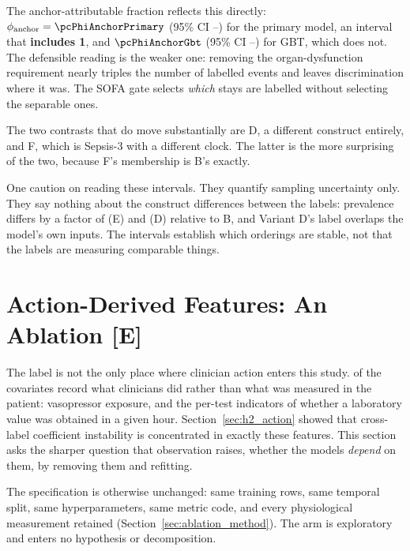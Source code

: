 The anchor-attributable fraction reflects this directly:
$\phi_{\text{anchor}} = \pcPhiAnchorPrimary$ (95\% CI
\pcPhiAnchorCiLoPrimary--\pcPhiAnchorCiHiPrimary) for the primary model, an
interval that \textbf{includes 1}, and $\pcPhiAnchorGbt$ (95\% CI
\pcPhiAnchorCiLoGbt--\pcPhiAnchorCiHiGbt) for GBT, which does not. The
defensible reading is the weaker one: removing the organ-dysfunction
requirement nearly triples the number of labelled events and leaves
discrimination where it was. The SOFA gate selects \emph{which} stays are
labelled without selecting the separable ones.

The two contrasts that do move substantially are D, a different construct
entirely, and F, which is Sepsis-3 with a different clock. The latter is the
more surprising of the two, because F's membership is B's exactly.

One caution on reading these intervals. They quantify sampling uncertainty
only. They say nothing about the construct differences between the labels:
prevalence differs by a factor of \pcAltEventRatioPrimaryE{} (E) and
\pcAltEventRatioPrimaryD{} (D) relative to B, and Variant D's label overlaps
the model's own inputs. The intervals establish which orderings are stable, not
that the labels are measuring comparable things.




\section{Action-Derived Features: An Ablation \texorpdfstring{[E]}{[E]}}
\label{sec:ablation}

The label is not the only place where clinician action enters this study.
\pcAblNDropped{} of the \pcHTwoNTerms{} covariates record what clinicians did
rather than what was measured in the patient: vasopressor exposure, and the
per-test indicators of whether a laboratory value was obtained in a given hour.
Section~\ref{sec:h2_action} showed that cross-label coefficient instability is
concentrated in exactly these features. This section asks the sharper question
that observation raises, whether the models \emph{depend} on them, by
removing them and refitting.

The specification is otherwise unchanged: same training rows, same temporal
split, same hyperparameters, same metric code, and every physiological
measurement retained (Section~\ref{sec:ablation_method}). The arm is
exploratory and enters no hypothesis or decomposition.

